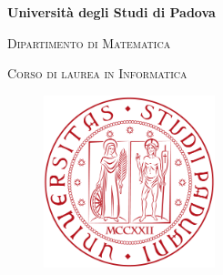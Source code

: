 \begin{titlepage}

\begin{center}

\begin{LARGE}
\textbf{Università degli Studi di Padova}\\
\end{LARGE}

\vspace{10pt}

\begin{Large}
\textsc{Dipartimento di Matematica}\\
\end{Large}

\vspace{10pt}

\begin{large}
\textsc{Corso di laurea in Informatica}\\
\end{large}

\vspace{30pt}
\begin{figure}[htbp]
\begin{center}
\includegraphics[height=5cm]{images/logo-unipd.png}
\end{center}
\end{figure}
\vspace{20pt} 

\begin{LARGE}
\begin{center}
\textbf{\mytitle}\\
\end{center}
\end{LARGE}

\vspace{10pt} 

\begin{large}
\textsl{\mydegree}\\
\end{large}


\end{center}
\end{titlepage}
